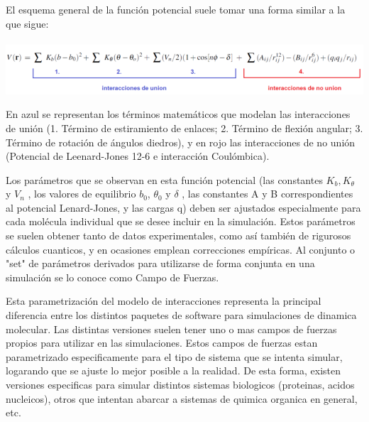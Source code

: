 \documentclass[a4paper,10pt]{report}
\begin{document}
El esquema general de la función potencial suele tomar una forma similar a la que sigue: \\ \\ 
\includegraphics[keepaspectratio, width=1.0\textwidth]{img/ecPotencialAmber.png}
\vspace{2pt}

En azul se representan los términos matemáticos que modelan las interacciones de unión (1. Término de estiramiento de enlaces; 2. Término de flexión angular; 3. Término de rotación de ángulos diedros), y en rojo
las interacciones de no unión (Potencial de Leenard-Jones 12-6 e interacción Coulómbica).

Los parámetros que se observan en esta función potencial (las constantes $K_b, K_{\theta}$ y $V_n$ , los valores de equilibrio $b_0$, $\theta_0$ y $\delta$ , 
las constantes A y B correspondientes al potencial Lenard-Jones, y las cargas q) deben ser ajustados especialmente para cada molécula individual que se desee incluir en la 
simulación. Estos parámetros se suelen obtener tanto de datos experimentales, como así también de rigurosos cálculos cuanticos, y en ocasiones emplean correcciones empíricas.
Al conjunto o "set" de parámetros derivados para utilizarse de forma conjunta en una simulación se lo conoce como Campo de Fuerzas.

Esta parametrización del modelo de interacciones representa la principal diferencia entre los distintos paquetes de software para simulaciones de dinamica molecular. 
Las distintas versiones suelen tener uno o mas campos de fuerzas propios para utilizar en las simulaciones. 
Estos campos de fuerzas estan parametrizado especificamente para el tipo de sistema que se intenta simular, logarando que se ajuste lo mejor posible a la realidad. De esta forma, existen versiones especificas para simular distintos sistemas biologicos (proteinas, acidos nucleicos), otros que intentan abarcar a sistemas de quimica organica en general, etc.
\end{document}
